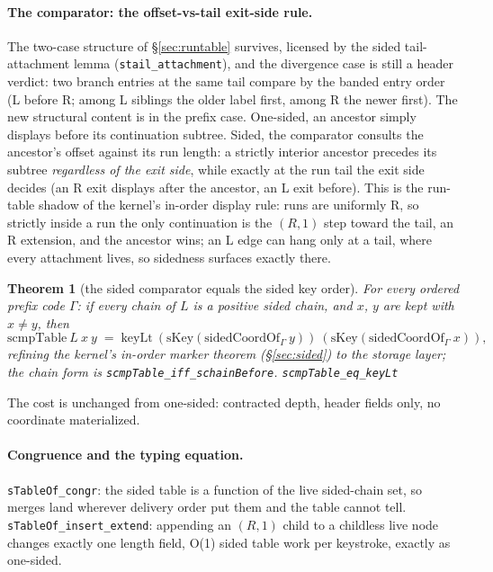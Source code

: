 \documentclass[11pt]{article}
\newtheorem{theorem}{Theorem}[section]
\newcommand{\lean}[1]{\texttt{#1}}
\begin{document}
\paragraph{The comparator: the offset-vs-tail exit-side rule.} The
two-case structure of \S\ref{sec:runtable} survives, licensed by the
sided tail-attachment lemma (\lean{stail\_attachment}), and the
divergence case is still a header verdict: two branch entries at the
same tail compare by the banded entry order (L before R; among L
siblings the older label first, among R the newer first). The new
structural content is in the prefix case. One-sided, an ancestor simply
displays before its continuation subtree. Sided, the comparator
consults the ancestor's offset against its run length: a strictly
interior ancestor precedes its subtree \emph{regardless of the exit
side}, while exactly at the run tail the exit side decides (an R exit
displays after the ancestor, an L exit before). This is the run-table
shadow of the kernel's in-order display rule: runs are uniformly R, so
strictly inside a run the only continuation is the $(R,1)$ step toward
the tail, an R extension, and the ancestor wins; an L edge can hang
only at a tail, where every attachment lives, so sidedness surfaces
exactly there.

\begin{theorem}[the sided comparator equals the sided key order]
\label{thm:sidedcmp}
For every ordered prefix code $\Gamma$: if every chain of $L$ is a
positive sided chain, and $x$, $y$ are kept with $x \neq y$, then
\[
  \mathrm{scmpTable}\ L\ x\ y \;=\; \mathrm{keyLt}\
  (\mathrm{sKey}(\mathrm{sidedCoordOf}_\Gamma\ y))\
  (\mathrm{sKey}(\mathrm{sidedCoordOf}_\Gamma\ x)),
\]
refining the kernel's in-order marker theorem (\S\ref{sec:sided}) to
the storage layer; the chain form is
\lean{scmpTable\_iff\_schainBefore}.
\hfill\lean{scmpTable\_eq\_keyLt}
\end{theorem}

\noindent The cost is unchanged from one-sided: contracted depth,
header fields only, no coordinate materialized.

\paragraph{Congruence and the typing equation.} \lean{sTableOf\_congr}:
the sided table is a function of the live sided-chain set, so merges
land wherever delivery order put them and the table cannot tell.
\lean{sTableOf\_insert\_extend}: appending an $(R,1)$ child to a
childless live node changes exactly one length field, O(1) sided table
work per keystroke, exactly as one-sided.
\end{document}
